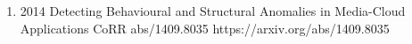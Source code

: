 {\begin{enumerate}
        \item {}
                        {2014}
                        {Detecting Behavioural and Structural Anomalies in Media-Cloud Applications}
                        {CoRR abs/1409.8035}
                        {https://arxiv.org/abs/1409.8035}

    \end{enumerate}

}


